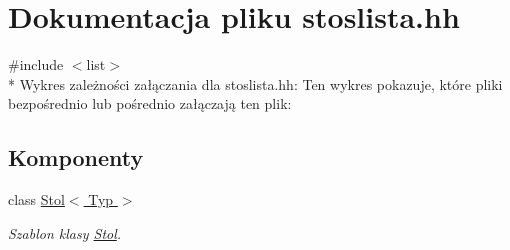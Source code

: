 \hypertarget{stoslista_8hh}{\section{Dokumentacja pliku stoslista.\-hh}
\label{stoslista_8hh}
}
{\ttfamily \#include $<$list$>$}\\*
Wykres zależności załączania dla stoslista.\-hh\-:
Ten wykres pokazuje, które pliki bezpośrednio lub pośrednio załączają ten plik\-:
\subsection*{Komponenty}
\begin{DoxyCompactItemize}
\item 
class \hyperlink{class_stol}{Stol$<$ Typ $>$}
\begin{DoxyCompactList}\small\item\em Szablon klasy \hyperlink{class_stol}{Stol}. \end{DoxyCompactList}\end{DoxyCompactItemize}
